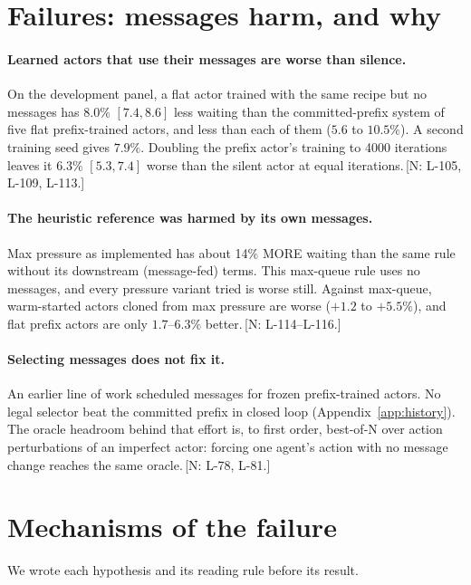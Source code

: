 \documentclass[11pt]{article}
\theoremstyle{definition}
\newif\ifshownotes\shownotestrue
\newcommand{\NOTE}[1]{\ifshownotes{\color{notecol}\,\textsf{\footnotesize[N: #1]}}\fi}
\begin{document}
\section{Failures: messages harm, and why}\label{sec:fail}
\paragraph{Learned actors that use their messages are worse than silence.} On the development panel, a flat actor
trained with the same recipe but no messages has $8.0\%$ $[7.4,8.6]$ less waiting than the committed-prefix system of
five flat prefix-trained actors, and less than each of them ($5.6$ to $10.5\%$). A second training seed gives $7.9\%$.
Doubling the prefix actor's training to 4000 iterations leaves it $6.3\%$ $[5.3,7.4]$ worse than the silent actor at
equal iterations.\NOTE{L-105, L-109, L-113.}
\paragraph{The heuristic reference was harmed by its own messages.} Max pressure as implemented has about 14\% MORE
waiting than the same rule without its downstream (message-fed) terms. This max-queue rule uses no messages, and every
pressure variant tried is worse still. Against max-queue, warm-started actors cloned from max pressure are worse
($+1.2$ to $+5.5\%$), and flat prefix actors are only $1.7$--$6.3\%$ better.\NOTE{L-114--L-116.}
\paragraph{Selecting messages does not fix it.} An earlier line of work scheduled messages for frozen prefix-trained
actors. No legal selector beat the committed prefix in closed loop (Appendix~\ref{app:history}). The oracle headroom
behind that effort is, to first order, best-of-N over action perturbations of an imperfect actor: forcing one agent's
action with no message change reaches the same oracle.\NOTE{L-78, L-81.}

\section{Mechanisms of the failure}\label{sec:mech}
We wrote each hypothesis and its reading rule before its result.
\end{document}
